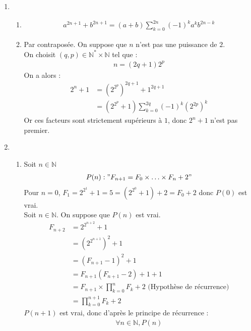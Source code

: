 \documentclass[titlepage, twoside]{report}
\begin{document}
\begin{enumerate}
    \item \begin{enumerate}
        \item \begin{align*}
            a^{2n+1} + b^{2n+1} = (a + b) \sum_{k=0}^{2n} (-1)^k a^k b^{2n-k}
        \end{align*}

        \item Par contraposée. On suppose que $n$ n'est pas une puissance de $2$. \\
        On choisit $(q, p) \in \mathbb{N}^* \times \mathbb{N}$ tel que : 
        \begin{align*}
            n = (2q+1)2^p
        \end{align*}
        On a alors : 
        \begin{align*}
            2^n + 1 &= (2^{2^p})^{2q+1} + 1^{2q+1} \\
            &= (2^{2^p} + 1) \sum_{k=0}^{2q} (-1)^k (2^{2p})^k 
        \end{align*}
        Or ces facteurs sont strictement supérieurs à $1$, donc $2^n + 1$ n'est pas premier. 
    \end{enumerate}

    \item \begin{enumerate}
        \item Soit $n \in \mathbb{N}$
        \begin{align*}
            P(n) : "F_{n+1} = F_0 \times \ldots \times F_n + 2"
        \end{align*}
        Pour $n = 0$, $F_1 = 2^{2^1} + 1 = 5 = (2^{2^0} + 1) + 2 = F_0 + 2$ donc $P(0)$ est vrai. \\
        Soit $n \in \mathbb{N}$. On suppose que $P(n)$ est vrai. 
        \begin{align*}
            F_{n+2} &= 2^{2^{n+2}} + 1 \\
            &= ({2^{2^{n+1}}})^2 + 1 \\
            &= (F_{n+1}-1)^2 + 1 \\
            &= F_{n+1}(F_{n+1} - 2) + 1 + 1 \\
            &= F_{n+1} \times \prod_{k=0}^{n} F_k + 2 \text{ (Hypothèse de récurrence)} \\
            &= \boxed{\prod_{k=0}^{n+1} F_k + 2} 
        \end{align*}
        $P(n+1)$ est vrai, donc d'après le principe de récurrence : 
        \begin{align*}
            \forall n \in \mathbb{N}, P(n)
        \end{align*}


\end{enumerate}
\end{enumerate}
\end{document}
